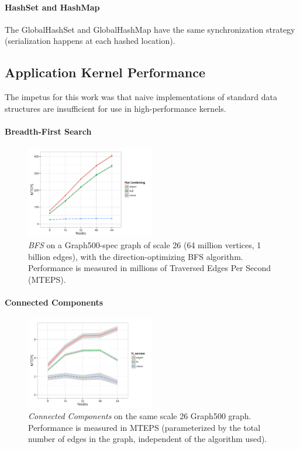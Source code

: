 
\paragraph{HashSet and HashMap}
The GlobalHashSet and GlobalHashMap have the same synchronization strategy (serialization happens at each hashed location).

\subsection{Application Kernel Performance}
The impetus for this work was that naive implementations of standard data structures are insufficient for use in high-performance kernels.

\paragraph{Breadth-First Search}
\begin{figure}[t]
  \centering
  \includegraphics[width=0.5\textwidth]{data/plots/bfs_perf.pdf}
  \caption{\emph{BFS} on a Graph500-spec graph of scale 26 (64 million vertices, 1 billion edges), with the direction-optimizing BFS algorithm. Performance is measured in millions of Traversed Edges Per Second (MTEPS).}
  \label{fig:bfs_perf}
\end{figure}


\paragraph{Connected Components}

\begin{figure}[t]
  \centering
  \includegraphics[width=0.5\textwidth]{data/plots/cc_perf.pdf}
  \caption{\emph{Connected Components} on the same scale 26 Graph500 graph. Performance is measured in MTEPS (parameterized by the total number of edges in the graph, independent of the algorithm used).}
  \label{fig:cc_perf}
\end{figure}

